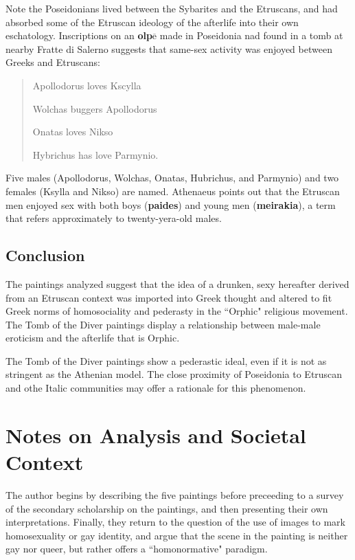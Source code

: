 Note the Poseidonians lived between the Sybarites and the Etruscans, and had absorbed some of the Etruscan ideology of the afterlife into their own eschatology. Inscriptions on an \textbf{olp$\overline{\text{e}}$} made in Poseidonia nad found in a tomb at nearby Fratte di Salerno suggests that same-sex activity was enjoyed between Greeks and Etruscans:

\begin{quotation}
    Apollodorus loves Kscylla 

    Wolchas buggers Apollodorus

    Onatas loves Nikso

    Hybrichus has love Parmynio.
\end{quotation}

Five males (Apollodorus, Wolchas, Onatas, Hubrichus, and Parmynio) and two females (Ksylla and Nikso) are named. Athenaeus points out that the Etruscan men enjoyed sex with both boys (\textbf{paides}) and young men (\textbf{meirakia}), a term that refers approximately to twenty-yera-old males.

\subsection{Conclusion}

The paintings analyzed suggest that the idea of a drunken, sexy hereafter derived from an Etruscan context was imported into Greek thought and altered to fit Greek norms of homosociality and pederasty in the ``Orphic" religious movement. The Tomb of the Diver paintings display a relationship between male-male eroticism and the afterlife that is Orphic.

The Tomb of the Diver paintings show a pederastic ideal, even if it is not as stringent as the Athenian model. The close proximity of Poseidonia to Etruscan and othe Italic communities may offer a rationale for this phenomenon.





\section{Notes on Analysis and Societal Context}
\label{sec:SocCont3}

\begin{rmk}
    The author begins by describing the five paintings before preceeding to a survey of the secondary scholarship on the paintings, and then presenting their own interpretations. Finally, they return to the question of the use of images to mark homosexuality or gay identity, and argue that the scene in the painting is neither gay nor queer, but rather offers a ``homonormative" paradigm.
\end{rmk}


